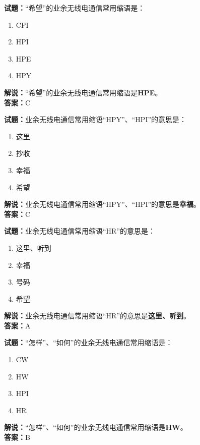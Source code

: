 \documentclass{ctexbook}
\begin{document}
\bigskip


\noindent\textbf{试题：}“希望”的业余无线电通信常用缩语是：
\begin{enumerate}[leftmargin=3em]
\item CPI
\item HPI
\item HPE
\item HPY
\end{enumerate}
\noindent\textbf{解说：}“希望”的业余无线电通信常用缩语是\textbf{HPE}。\\\noindent\textbf{答案：}C



\bigskip


\noindent\textbf{试题：}业余无线电通信常用缩语“HPY”、“HPI”的意思是：
\begin{enumerate}[leftmargin=3em]
\item 这里
\item 抄收
\item 幸福
\item 希望
\end{enumerate}
\noindent\textbf{解说：}业余无线电通信常用缩语“HPY”、“HPI”的意思是\textbf{幸福}。\\\noindent\textbf{答案：}C



\bigskip


\noindent\textbf{试题：}业余无线电通信常用缩语“HR”的意思是：
\begin{enumerate}[leftmargin=3em]
\item 这里、听到
\item 幸福
\item 号码
\item 希望
\end{enumerate}
\noindent\textbf{解说：}业余无线电通信常用缩语“HR”的意思是\textbf{这里、听到}。\\\noindent\textbf{答案：}A

\bigskip


\noindent\textbf{试题：}“怎样”、“如何”的业余无线电通信常用缩语是：
\begin{enumerate}[leftmargin=3em]
\item CW
\item HW
\item HPI
\item HR
\end{enumerate}
\noindent\textbf{解说：}“怎样”、“如何”的业余无线电通信常用缩语是\textbf{HW}。\\\noindent\textbf{答案：}B
\end{document}
